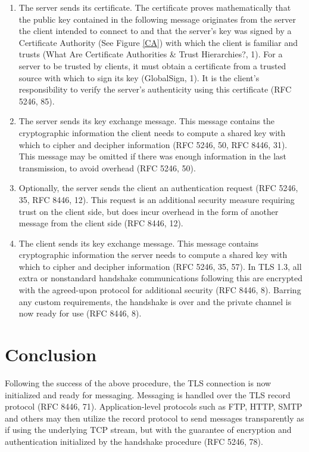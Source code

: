 \documentclass[12pt]{article}
\begin{document}
\begin{enumerate}[rightmargin=1cm]
    \item The server sends its certificate. The certificate proves mathematically that the public key contained in the following message originates from the server the client intended to connect to and that the server’s key was signed by a Certificate Authority (See Figure \ref{CA}) with which the client is familiar and trusts (What Are Certificate Authorities \& Trust Hierarchies?, 1). For a server to be trusted by clients, it must obtain a certificate from a trusted source with which to sign its key (GlobalSign, 1). It is the client’s responsibility to verify the server’s authenticity using this certificate (RFC 5246, 85).
    \item The server sends its key exchange message. This message contains the cryptographic information the client needs to compute a shared key with which to cipher and decipher information (RFC 5246, 50, RFC 8446, 31). This message may be omitted if there was enough information in the last transmission, to avoid overhead (RFC 5246, 50).
    \item Optionally, the server sends the client an authentication request (RFC 5246, 35, RFC 8446, 12). This request is an additional security measure requiring trust on the client side, but does incur overhead in the form of another message from the client side (RFC 8446, 12).
    \item The client sends its key exchange message. This message contains cryptographic information the server needs to compute a shared key with which to cipher and decipher information (RFC 5246, 35, 57). In TLS 1.3, all extra or nonstandard handshake communications following this are encrypted with the agreed-upon protocol for additional security (RFC 8446, 8). Barring any custom requirements, the handshake is over and the private channel is now ready for use (RFC 8446, 8).
\end{enumerate}

\section{Conclusion}
Following the success of the above procedure, the TLS connection is now initialized and ready for messaging. Messaging is handled over the TLS record protocol (RFC 8446, 71). Application-level protocols such as FTP, HTTP, SMTP and others may then utilize the record protocol to send messages transparently as if using the underlying TCP stream, but with the guarantee of encryption and authentication initialized by the handshake procedure (RFC 5246, 78).
\end{document}
